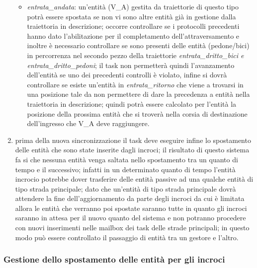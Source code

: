 \begin{enumerate}
\begin{itemize}
\item \textit{en\-tra\-ta\_an\-da\-ta}: un'entità (V\_A) gestita da traiettorie di questo tipo potrà essere spostata se non vi sono altre entità già in gestione dalla traiettoria in descrizione; occorre controllare se i protocolli precedenti hanno dato l'abilitazione per il completamento dell'attraversamento e inoltre è necessario controllare se sono presenti delle entità (pedone/bici) in percorrenza nel secondo pezzo della traiettorie \textit{en\-tra\-ta\_drit\-to\_bi\-ci e en\-tra\-ta\_drit\-to\_pe\-do\-ni}; il task non permetterà quindi l'avanzamento dell'entità se uno dei precedenti controlli è violato, infine si dovrà controllare se esiste un'entità in \textit{en\-tra\-ta\_ri\-tor\-no} che viene a trovarsi in una posizione tale da non permettere di dare la precedenza a entità nella traiettoria in descrizione; quindi potrà essere calcolato per l'entità la posizione della prossima entità che si troverà nella corsia di destinazione dell'ingresso che V\_A deve raggiungere.
\end{itemize}
\item prima della nuova sincronizzazione il task deve eseguire infine lo spostamento delle entità che sono state inserite dagli incroci; il risultato di questo sistema fa si che nessuna entità venga saltata nello spostamento tra un quanto di tempo e il successivo; infatti in un determinato quanto di tempo l'entità incrocio potrebbe dover trasferire delle entità passive ad una qualche entità di tipo strada principale; dato che un'entità di tipo strada principale dovrà attendere la fine dell'aggiornamento da parte degli incroci da cui è limitata allora le entità che verranno poi spostate saranno tutte in quanto gli incroci saranno in attesa per il nuovo quanto del sistema e non potranno procedere con nuovi inserimenti nelle mailbox dei task delle strade principali; in questo modo può essere controllato il passaggio di entità tra un gestore e l'altro.   
\end{enumerate} 

\subsubsection{Gestione dello spostamento delle entità per gli incroci}
\label{spostamentoIncroci}